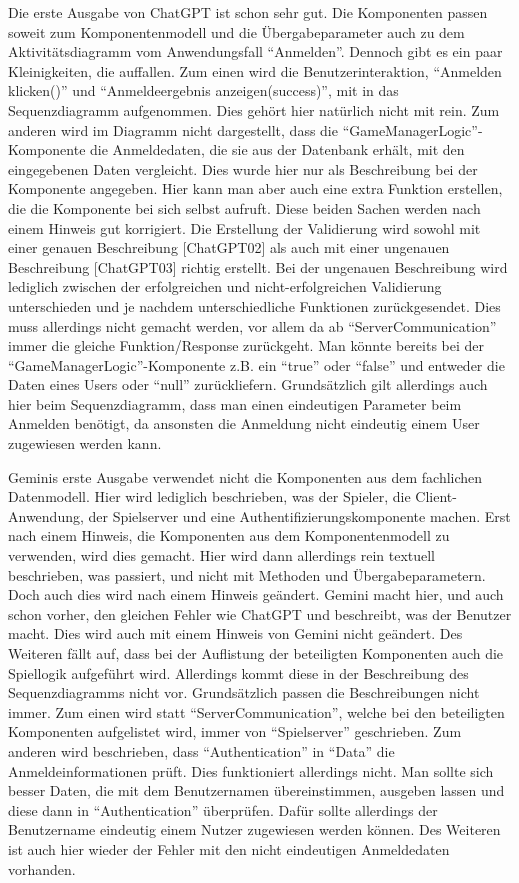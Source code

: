 Die erste Ausgabe von ChatGPT ist schon sehr gut. Die Komponenten passen soweit zum Komponentenmodell und die Übergabeparameter auch 
zu dem Aktivitätsdiagramm vom Anwendungsfall ``Anmelden''. Dennoch gibt es ein paar Kleinigkeiten, die auffallen. Zum einen wird die 
Benutzerinteraktion, ``Anmelden klicken()'' und ``Anmeldeergebnis anzeigen(success)'', mit in das Sequenzdiagramm aufgenommen. Dies gehört 
hier natürlich nicht mit rein. Zum anderen wird im Diagramm nicht dargestellt, dass die ``GameManagerLogic''-Komponente die 
Anmeldedaten, die sie aus der Datenbank erhält, mit den eingegebenen Daten vergleicht. Dies wurde hier nur als Beschreibung bei der 
Komponente angegeben. Hier kann man aber auch eine extra Funktion erstellen, die die Komponente bei sich selbst aufruft. Diese beiden 
Sachen werden nach einem Hinweis gut korrigiert. Die Erstellung der Validierung wird sowohl mit einer genauen Beschreibung [ChatGPT02] 
als auch mit einer ungenauen Beschreibung [ChatGPT03] richtig erstellt. Bei der ungenauen Beschreibung wird lediglich zwischen der 
erfolgreichen und nicht-erfolgreichen Validierung unterschieden und je nachdem unterschiedliche Funktionen zurückgesendet. Dies muss 
allerdings nicht gemacht werden, vor allem da ab ``ServerCommunication'' immer die gleiche Funktion/Response zurückgeht. Man könnte 
bereits bei der ``GameManagerLogic''-Komponente z.B. ein ``true'' oder ``false'' und entweder die Daten eines Users oder ``null'' 
zurückliefern. Grundsätzlich gilt allerdings auch hier beim Sequenzdiagramm, dass man einen eindeutigen Parameter beim Anmelden 
benötigt, da ansonsten die Anmeldung nicht eindeutig einem User zugewiesen werden kann.

Geminis erste Ausgabe verwendet nicht die Komponenten aus dem fachlichen Datenmodell. Hier wird lediglich beschrieben, was der 
Spieler, die Client-Anwendung, der Spielserver und eine Authentifizierungskomponente machen. Erst nach einem Hinweis, die Komponenten 
aus dem Komponentenmodell zu verwenden, wird dies gemacht. Hier wird dann allerdings rein textuell beschrieben, was passiert, und 
nicht mit Methoden und Übergabeparametern. Doch auch dies wird nach einem Hinweis geändert. Gemini macht hier, und auch schon vorher, 
den gleichen Fehler wie ChatGPT und beschreibt, was der Benutzer macht. Dies wird auch mit einem Hinweis von Gemini nicht geändert. 
Des Weiteren fällt auf, dass bei der Auflistung der beteiligten Komponenten auch die Spiellogik aufgeführt wird. Allerdings kommt 
diese in der Beschreibung des Sequenzdiagramms nicht vor. Grundsätzlich passen die Beschreibungen nicht immer. Zum einen wird statt 
``ServerCommunication'', welche bei den beteiligten Komponenten aufgelistet wird, immer von ``Spielserver'' geschrieben. Zum anderen wird 
beschrieben, dass ``Authentication'' in ``Data'' die Anmeldeinformationen prüft. Dies funktioniert allerdings nicht. Man sollte sich 
besser Daten, die mit dem Benutzernamen übereinstimmen, ausgeben lassen und diese dann in ``Authentication'' überprüfen. Dafür sollte allerdings 
der Benutzername eindeutig einem Nutzer zugewiesen werden können. Des Weiteren ist auch hier wieder der Fehler mit den nicht eindeutigen 
Anmeldedaten vorhanden.


